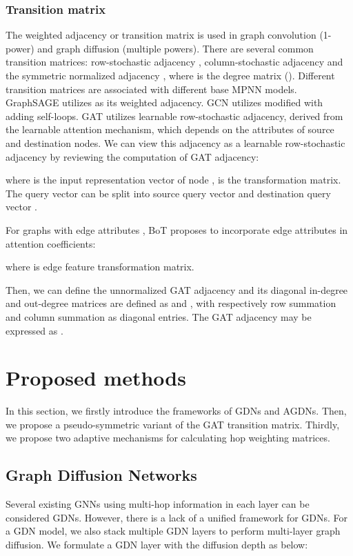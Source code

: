 \documentclass{article}
\begin{document}
\subsubsection{Transition matrix}
The weighted adjacency or transition matrix is used in graph convolution (1-power) and graph diffusion (multiple powers). There are several common transition matrices: row-stochastic adjacency , column-stochastic adjacency  and the symmetric normalized adjacency , where  is the degree matrix (). Different transition matrices are associated with different base MPNN models. GraphSAGE utilizes  as its weighted adjacency. GCN utilizes  modified with adding self-loops. GAT utilizes learnable row-stochastic adjacency, derived from the learnable attention mechanism, which depends on the attributes of source and destination nodes. We can view this adjacency as a learnable row-stochastic adjacency by reviewing the computation of GAT adjacency:


where  is the input representation vector of node ,  is the transformation matrix. The query vector  can be split into source query vector  and destination query vector .

For graphs with edge attributes , BoT \cite{wang2021bag} proposes to incorporate edge attributes in attention coefficients:

where  is edge feature transformation matrix.



Then, we can define the unnormalized GAT adjacency  and its diagonal in-degree and out-degree matrices are defined as  and , with respectively row summation and column summation as diagonal entries. The GAT adjacency may be expressed as .

\section{Proposed methods}

In this section, we firstly introduce the frameworks of GDNs and AGDNs. Then, we propose a pseudo-symmetric variant of the GAT transition matrix. Thirdly, we propose two adaptive mechanisms for calculating hop weighting matrices. 

\subsection{Graph Diffusion Networks}
Several existing GNNs using multi-hop information in each layer can be considered GDNs. However, there is a lack of a unified framework for GDNs. For a GDN model, we also stack multiple GDN layers to perform multi-layer graph diffusion. We formulate a GDN layer with the diffusion depth  as below:
\end{document}

